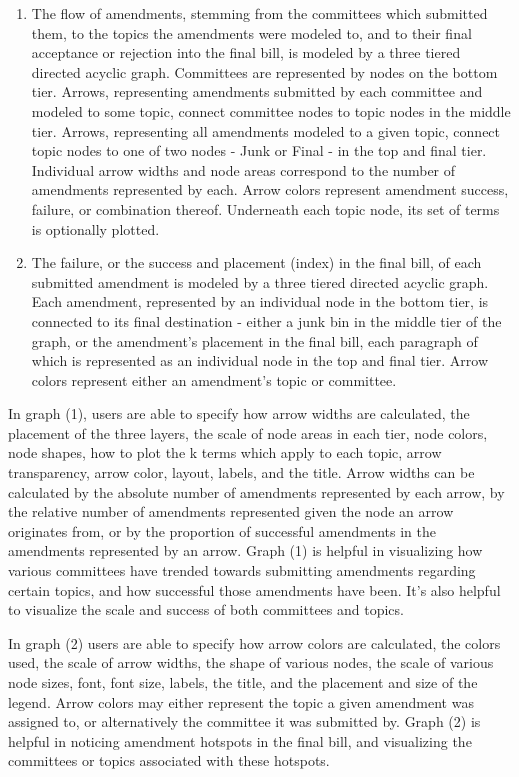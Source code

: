 \documentclass[11pt]{article}
\begin{document}
\begin{enumerate}
\item The flow of amendments, stemming  from the committees which submitted them, to the topics the amendments were modeled to, and to their final acceptance or rejection into the final bill, is modeled by a three tiered directed acyclic graph.
Committees are represented by nodes on the bottom tier. Arrows, representing amendments submitted by each committee and modeled to some topic, connect committee nodes to topic nodes in the middle tier. Arrows, representing all amendments modeled to a given topic, connect topic nodes to one of two nodes - Junk or Final - in the top and final tier. Individual arrow widths and node areas correspond to the number of amendments represented by each. Arrow colors represent amendment success, failure, or combination thereof. Underneath each topic node, its set of terms is optionally plotted. 
\item The failure, or the success and placement (index) in the final bill, of each submitted amendment is modeled by a three tiered directed acyclic graph. Each amendment, represented by an individual node in the bottom tier, is connected to its final destination - either a junk bin in the middle tier of the graph, or the amendment's placement in the final bill, each paragraph of which is represented as an individual node in the top and final tier. Arrow colors represent either an amendment's topic or committee.
\end{enumerate}

In graph (1), users are able to specify how arrow widths are calculated, the placement of the three layers, the scale of node areas in each tier, node colors, node shapes, how to plot the k terms which apply to each topic, arrow transparency, arrow color, layout, labels, and the title. Arrow widths can be calculated by the absolute number of amendments represented by each arrow, by the relative number of amendments represented given the node an arrow originates from, or by the proportion of successful amendments in the amendments represented by an arrow. Graph (1) is helpful in visualizing how various committees have trended towards submitting amendments regarding certain topics, and how successful those amendments have been. It's also helpful to visualize the scale and success of both committees and topics.

In graph (2) users are able to specify how arrow colors are calculated, the colors used, the scale of arrow widths, the shape of various nodes, the scale of various node sizes, font, font size, labels, the title, and the placement and size of the legend. Arrow colors may either represent the topic a given amendment was assigned to, or alternatively the committee it was submitted by. Graph (2) is helpful in noticing amendment hotspots in the final bill, and visualizing the committees or topics associated with these hotspots.
\end{document}
